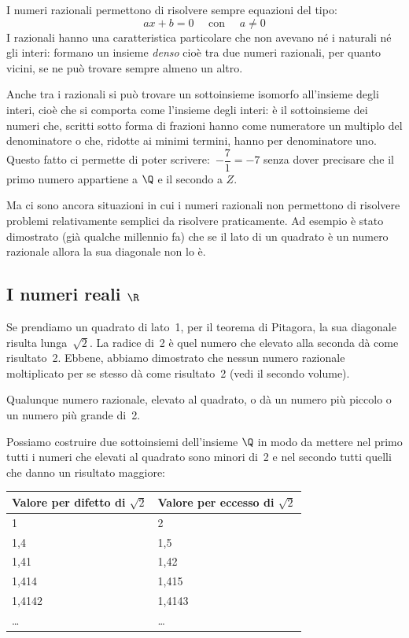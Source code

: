 I numeri razionali permettono di risolvere sempre equazioni del tipo: 
\[ax+b=0 \quad \text{ con } \quad a \neq 0\]
I razionali hanno una caratteristica particolare che non avevano né i naturali 
né gli interi: formano un insieme \emph{denso} cioè tra due numeri razionali, 
per quanto vicini, se ne può trovare sempre almeno un altro.

Anche tra i razionali si può trovare un sottoinsieme isomorfo all'insieme degli 
interi, cioè che si comporta come l'insieme degli interi: è il sottoinsieme dei 
numeri che, scritti sotto forma di frazioni hanno come numeratore un multiplo 
del denominatore o che, ridotte ai minimi termini, hanno per denominatore uno. 
Questo fatto ci permette di poter scrivere:~\(-\dfrac{7}{1} = -7\) senza dover 
precisare che il primo numero appartiene a \(\Q\) e il secondo a \(Z\).

Ma ci sono ancora situazioni in cui i numeri razionali non permettono di 
risolvere problemi relativamente semplici da risolvere praticamente. Ad esempio 
è stato dimostrato (già qualche millennio fa) che se il lato di un quadrato è un 
numero razionale allora la sua diagonale non lo è. 

\subsection{I numeri reali \(\R\)} 
\label{subsec:insnum_reali}

Se prendiamo un quadrato di lato~1, per il teorema di Pitagora, la sua diagonale 
risulta lunga~\(\sqrt{2}\). La radice di~2 è quel numero che elevato alla 
seconda dà come risultato~2. Ebbene, abbiamo dimostrato che nessun numero 
razionale moltiplicato per se stesso dà come risultato~2 (vedi il secondo 
volume). 

Qualunque numero razionale, elevato al quadrato, o dà un numero più piccolo o un 
numero più grande di~2.

Possiamo costruire due sottoinsiemi dell'insieme \(\Q\) in modo da 
mettere nel primo tutti i numeri che elevati al quadrato sono minori di~2 e nel 
secondo tutti quelli che danno un risultato maggiore:

\begin{center} 
\begin{tabular}{ll} 
\toprule Valore per difetto di \(\sqrt{2}\) 
&Valore per eccesso di \(\sqrt{2}\) \\ 
\midrule 
1& 2\\ 
1,4& 1,5 \\ 
1,41& 1,42\\ 
1,414& 1,415\\ 
1,4142& 1,4143\\ 
\ldots& \ldots\\ 
\bottomrule \end{tabular} 
\end{center}

